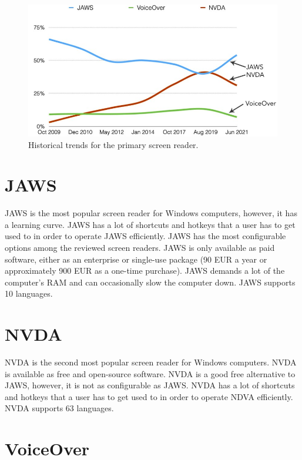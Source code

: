\begin{figure}[tp]
\centering
\includegraphics[keepaspectratio,width=\linewidth,height=\halfh]
{images/screen-readers-line.jpg}

\caption[Historical trends for primary screen reader]{
Historical trends for the primary screen reader.
}
\label{fig:screen-readers-line}
\end{figure}




\section{JAWS}
JAWS is the most popular screen reader for Windows computers, however, it has a learning curve. JAWS has a lot of shortcuts and hotkeys that a user has to get used to in order to operate JAWS efficiently. JAWS has the most configurable options among the reviewed screen readers. JAWS is only available as paid software, either as an enterprise or single-use package (90 EUR a year or approximately 900 EUR as a one-time purchase). JAWS demands a lot of the computer's RAM and can occasionally slow the computer down. JAWS supports 10 languages.

\section{NVDA}

NVDA is the second most popular screen reader for Windows computers. NVDA is available as free and open-source software. NVDA is a good free alternative to JAWS, however, it is not as configurable as JAWS. NVDA has a lot of shortcuts and hotkeys that a user has to get used to in order to operate NDVA efficiently. NVDA supports 63 languages.

\section{VoiceOver}

